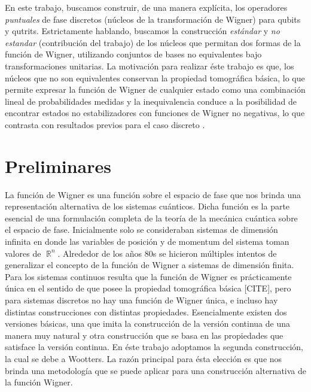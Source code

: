 \documentclass[a4paper]{report}
\DeclareMathOperator{\R}{\mathbb{R}}
\begin{document}
  En este trabajo, buscamos construir, de una manera
  explícita, los operadores \textit{puntuales} de fase
  discretos (núcleos de la transformación de Wigner) para
  qubits y qutrits. Estrictamente hablando, buscamos la
  construcción \textit{estándar}
  \cite{woottersWignerFunctionFormulationFiniteState1987} y
  \textit{no estandar} (contribución del trabajo) de los
  núcleos que permitan dos formas de la función de Wigner,
  utilizando conjuntos de bases no equivalentes bajo
  transformaciones unitarias. La motivación para realizar
  éste trabajo es que, los núcleos que no son equivalentes
  conservan la propiedad tomográfica básica, lo que permite
  expresar la función de Wigner de cualquier estado como una
  combinación lineal de probabilidades medidas y la
  inequivalencia conduce a la posibilidad de encontrar
  estados no estabilizadores con funciones de Wigner no
  negativas, lo que contrasta con resultados previos para el
  caso discreto
  \cite{grossHudsonTheoremFinitedimensional2006,
  galvaoDiscreteWignerFunctions2005,
  cormickInterferenceDiscreteWigner2006}.

  \chapter{Preliminares}

  La función de Wigner es una función sobre el espacio de
  fase que nos brinda una representación alternativa de los
  sistemas cuánticos. Dicha función es la parte esencial de
  una formulación completa de la teoría de la mecánica
  cuántica sobre el espacio de fase. Inicialmente solo se
  consideraban sistemas de dimensión infinita en donde las
  variables de posición y de momentum del sistema toman
  valores de $\R^{n}$. Alrededor de los años 80s se hicieron
  múltiples intentos de generalizar el concepto de la
  función de Wigner a sistemas de dimensión finita. Para los
  sistemas continuos resulta que la función de Wigner es
  prácticamente única en el sentido de que posee la
  propiedad tomográfica básica [CITE], pero para sistemas
  discretos no hay una función de Wigner única, e incluso
  hay distintas construcciones con distintas propiedades.
  Esencialmente existen dos versiones básicas, una que imita
  la construcción de la versión continua de una manera muy
  natural y otra construcción que se basa en las propiedades
  que satisface la versión continua. En éste trabajo
  adoptamos la segunda construcción, la cual se debe a
  Wootters. La razón principal para ésta elección es que nos
  brinda una metodología que se puede aplicar para una
  construcción alternativa de la función Wigner.
\end{document}
